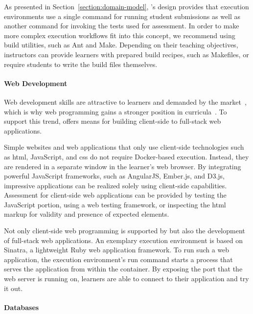 As presented in Section~\ref{section:domain-model}, \tool's design provides that execution environments use a single command for running student submissions as well as another command for invoking the tests used for assessment. In order to make more complex execution workflows fit into this concept, we recommend using build utilities, such as Ant and Make. Depending on their teaching objectives, instructors can provide learners with prepared build recipes, such as Makefiles, or require students to write the build files themselves.

\paragraph{Web Development}

Web development skills are attractive to learners and demanded by the market~\cite{european2014support}, which is why web programming gains a stronger position in \cs curricula~\cite{ihantola2010review}. To support this trend, \tool offers means for building client-side to full-stack web applications.

Simple websites and web applications that only use client-side technologies such as \gls{html}, JavaScript, and \gls{css} do not require Docker-based execution. Instead, they are rendered in a separate window in the learner's web browser. By integrating powerful JavaScript frameworks, such as AngularJS, Ember.js, and D3.js, impressive applications can be realized solely using client-side capabilities. Assessment for client-side web applications can be provided by testing the JavaScript portion, using a web testing framework, or inspecting the \gls{html} markup for validity and presence of expected elements.

Not only client-side web programming is supported by \tool but also the development of full-stack web applications. An exemplary execution environment is based on Sinatra, a lightweight Ruby web application framework. To run such a web application, the execution environment's run command starts a process that serves the application from within the container. By exposing the port that the web server is running on, learners are able to connect to their application and try it out.

\paragraph{Databases}

